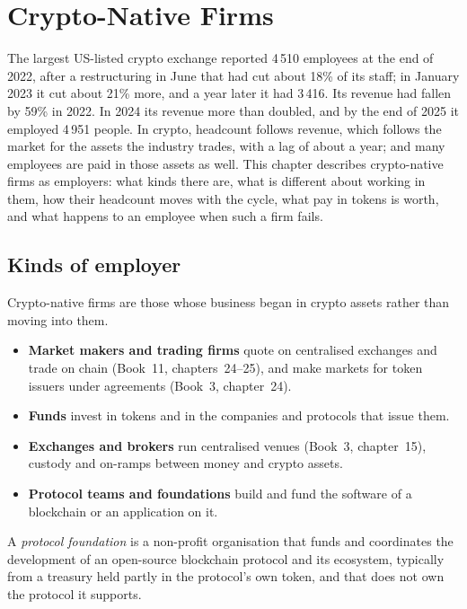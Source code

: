 \chapter{Crypto-Native Firms}\label{ch:in:crypto-native-firms}

The largest US-listed crypto exchange reported 4\,510 employees at the end of 2022, after a restructuring in June that
had cut about 18\% of its staff; in January 2023 it cut about 21\% more, and a year later it had 3\,416. Its revenue had
fallen by 59\% in 2022. In 2024 its revenue more than doubled, and by the end of 2025 it employed 4\,951 people. In crypto,
headcount follows revenue, which follows the market for the assets the industry trades, with a lag of about a year;
and many employees are paid in those assets as well. This chapter describes crypto-native firms as employers: what kinds there are, what is different about
working in them, how their headcount moves with the cycle, what pay in tokens is worth, and what happens to an employee
when such a firm fails.

\section{Kinds of employer}

Crypto-native firms are those whose business began in crypto assets rather than moving into them.
\begin{itemize}
\item \textbf{Market makers and trading firms} quote on centralised exchanges and trade on chain (Book~11,
chapters~24--25), and make markets for token issuers under agreements (Book~3, chapter~24).
\item \textbf{Funds} invest in tokens and in the companies and protocols that issue them.
\item \textbf{Exchanges and brokers} run centralised venues (Book~3, chapter~15), custody and on-ramps between money and
crypto assets.
\item \textbf{Protocol teams and foundations} build and fund the software of a blockchain or an application on it.
\end{itemize}

\begin{definition}\label{def:in:crypto-native-firms:foundation}
A \emph{protocol foundation} is a non-profit organisation that funds and coordinates the
development of an open-source blockchain protocol and its ecosystem, typically from a treasury held partly in the
protocol's own token, and that does not own the protocol it supports.
\end{definition}

